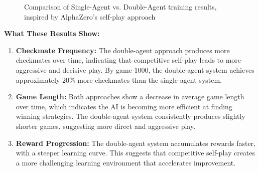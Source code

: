 \documentclass[11pt]{article}
\begin{document}
\begin{figure}[ht]
    \caption{Comparison of Single-Agent vs. Double-Agent training results, inspired by AlphaZero's self-play approach \cite{silver2018}}
    \label{fig:training_comparison}
\end{figure}

\textbf{What These Results Show:}

\begin{enumerate}
    \item \textbf{Checkmate Frequency:} The double-agent approach produces more checkmates over time, indicating that competitive self-play leads to more aggressive and decisive play. By game 1000, the double-agent system achieves approximately 20\% more checkmates than the single-agent system.
    
    \item \textbf{Game Length:} Both approaches show a decrease in average game length over time, which indicates the AI is becoming more efficient at finding winning strategies. The double-agent system consistently produces slightly shorter games, suggesting more direct and aggressive play.
    
    \item \textbf{Reward Progression:} The double-agent system accumulates rewards faster, with a steeper learning curve. This suggests that competitive self-play creates a more challenging learning environment that accelerates improvement.
\end{enumerate}


\end{document}
\end{tikzpicture}
\end{figure}
\end{document}
